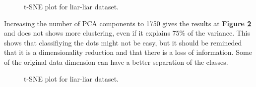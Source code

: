 \begin{figure}[h]
  \centering
  \caption{t-SNE plot for liar-liar dataset.}
  \label{fig:data_explo:tsne1}
\end{figure}

Increasing the number of PCA components to 1750 gives the results at \textbf{Figure \ref{fig:data_explo:tsne2}} and does not shows more clustering, even if it explains $75\%$ of the variance. This shows that classifiying the dots might not be easy, but it should be remineded that it is a dimensionality reduction and that there is a loss of information. Some of the original data dimension can have a better separation of the classes. 

\begin{figure}[h]
  \centering
  \caption{t-SNE plot for liar-liar dataset.}
  \label{fig:data_explo:tsne2}
\end{figure}

